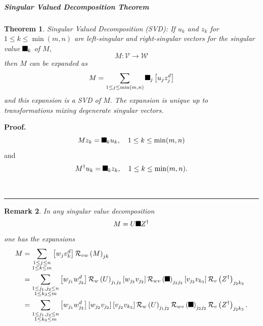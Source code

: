 \documentclass[aps,preprint]{revtex4}%
\providecommand{\U}[1]{\protect\rule{.1in}{.1in}}
\newtheorem{theorem}{Theorem}
\newtheorem{remark}[theorem]{Remark}
\newenvironment{proof}[1][Proof]{\noindent\textbf{#1.} }{\ \rule{0.5em}{0.5em}}
\begin{document}
\subparagraph{Singular Valued Decomposition Theorem}

\begin{theorem}
\emph{Singular Valued Decomposition (SVD)}: If $u_{k}$ and $z_{k}$ for $1\leq
k\leq\min(m,n)$ are \emph{left-singular} and \emph{right-singular} vectors for
the singular value $\U{3c3} _{k}$ of $M,$
\begin{equation}
M:\mathcal{V\rightarrow W}%
\end{equation}
then $M$ can be expanded as
\begin{equation}
M=\sum_{1\leq j\leq\min(m,n)}\U{3c3} _{j}\left[  u_{j}z_{j}^{d}\right]
\end{equation}
and this expansion \emph{is a} \emph{SVD of }$M.$ The expansion is unique up
to transformations mixing degenerate singular vectors.
\end{theorem}

\begin{proof}%
\begin{equation}
Mz_{k}=\U{3c3} _{k}u_{k},\quad1\leq k\leq\min(m,n)
\end{equation}
and
\begin{equation}
M^{\dagger}u_{k}=\U{3c3} _{k}z_{k},\quad1\leq k\leq\min(m,n).
\end{equation}

\end{proof}

\begin{remark}
In any singular value decomposition%
\begin{equation}
M=U\U{3a3} Z^{\dagger}%
\end{equation}
one has the expansions
\begin{align*}
M  &  =\sum_{\substack{1\leq j\leq n\\1\leq k\leq m}}\left[  w_{j}v_{k}%
^{d}\right]  \mathcal{R}_{vw}\left(  M\right)  _{jk}\\
&  =\sum_{\substack{1\leq j_{1},j_{2}\leq n\\1\leq k_{3}\leq m}}\left[
w_{j_{1}}w_{j_{2}}^{d}\right]  \mathcal{R}_{w}\left(  U\right)  _{j_{1}j_{2}%
}\left[  w_{j_{2}}v_{j_{2}}\right]  \mathcal{R}_{wv}\left(  \U{3a3} \right)
_{j_{2}j_{2}}\left[  v_{j_{2}}v_{k_{3}}\right]  \mathcal{R}_{v}\left(
Z^{\dagger}\right)  _{j_{2}k_{3}}\\
&  =\sum_{\substack{1\leq j_{1},j_{2}\leq n\\1\leq k_{3}\leq m}}\left[
w_{j_{1}}w_{j_{2}}^{d}\right]  \left[  w_{j_{2}}v_{j_{2}}\right]  \left[
v_{j_{2}}v_{k_{3}}\right]  \mathcal{R}_{w}\left(  U\right)  _{j_{1}j_{2}%
}\mathcal{R}_{wv}\left(  \U{3a3} \right)  _{j_{2}j_{2}}\mathcal{R}_{v}\left(
Z^{\dagger}\right)  _{j_{2}k_{3}}.
\end{align*}

\end{remark}
\end{document}
